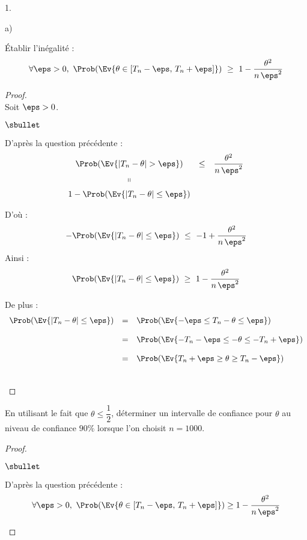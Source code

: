 \documentclass[11pt]{article}%
\begin{document}
\begin{noliste}{1.}
\begin{noliste}{a)}
  \item Établir l'inégalité :
    \[
      \forall \eps >0, \ \Prob(\Ev{\theta \in [T_n - \eps, \, T_n +
        \eps]}) \ \geq \ 1- \dfrac{\theta^2}{n \, \eps^2}
    \]
    \begin{proof}~\\
      Soit $\eps >0$.
      \begin{noliste}{$\sbullet$}
      \item D'après la question précédente :
        \[
          \begin{array}{ccc}
            \Prob(\Ev{ |T_n - \theta| > \eps}) & \leq &
            \dfrac{\theta^2}{n \,\eps^2}
            \\[.2cm]
            \shortparallel
            \\[.2cm]
            1- \Prob(\Ev{|T_n - \theta| \leq \eps})
          \end{array}
        \]


        \newpage


        \noindent
        D'où :
        \[
          -\Prob(\Ev{| T_n - \theta| \leq \eps}) \ \leq \ -1 +
          \dfrac{\theta^2}{n \, \eps^2}
        \]
        Ainsi :
        \[
          \Prob(\Ev{| T_n - \theta| \leq \eps}) \ \geq \ 1 -
          \dfrac{\theta^2}{n \, \eps^2}
        \]
        
      \item De plus :
        \[
          \begin{array}{rcl}
            \Prob(\Ev{| T_n - \theta| \leq \eps})
            & = & \Prob(\Ev{-\eps \leq T_n - \theta \leq \eps})
            \\[.4cm]
            & = & \Prob(\Ev{ -T_n- \eps \leq - \theta \leq -T_n +
                  \eps})
            \\[.4cm]
            & = & \Prob(\Ev{T_n + \eps \geq \theta \geq T_n - \eps})
          \end{array}
        \]
      \end{noliste}
      ~\\[-1cm]
    \end{proof}
    
  \item En utilisant le fait que $\theta \leq \dfrac{1}{2}$,
    déterminer un intervalle de confiance pour $\theta$ au niveau de
    confiance $90 \%$ lorsque l'on choisit $n=1000$.
    \begin{proof}~
      \begin{noliste}{$\sbullet$}
      \item D'après la question précédente :
        \[
          \forall \eps >0, \ \Prob(\Ev{ \theta \in
          [T_n - \eps, \, T_n + \eps]}) \geq 1- \dfrac{\theta^2}{n \,
          \eps^2}
        \]
        

\end{noliste}
\end{proof}
\end{noliste}
\end{noliste}
\end{document}
